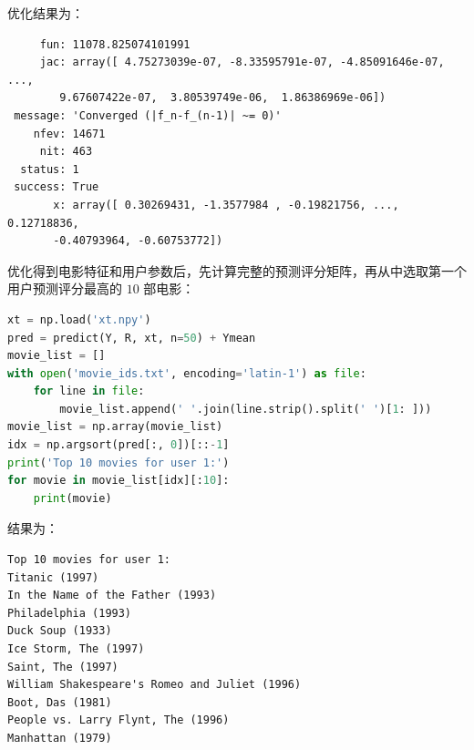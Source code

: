 优化结果为：

\begin{lstlisting}
     fun: 11078.825074101991
     jac: array([ 4.75273039e-07, -8.33595791e-07, -4.85091646e-07, ...,
        9.67607422e-07,  3.80539749e-06,  1.86386969e-06])
 message: 'Converged (|f_n-f_(n-1)| ~= 0)'
    nfev: 14671
     nit: 463
  status: 1
 success: True
       x: array([ 0.30269431, -1.3577984 , -0.19821756, ...,  0.12718836,
       -0.40793964, -0.60753772])
\end{lstlisting}

优化得到电影特征和用户参数后，先计算完整的预测评分矩阵，再从中选取第一个用户预测评分最高的 $10$ 部电影：

\begin{lstlisting}[language=Python]
xt = np.load('xt.npy')
pred = predict(Y, R, xt, n=50) + Ymean
movie_list = []
with open('movie_ids.txt', encoding='latin-1') as file:
	for line in file:
		movie_list.append(' '.join(line.strip().split(' ')[1: ]))
movie_list = np.array(movie_list)
idx = np.argsort(pred[:, 0])[::-1]
print('Top 10 movies for user 1:')
for movie in movie_list[idx][:10]:
	print(movie)
\end{lstlisting}

结果为：

\begin{lstlisting}
Top 10 movies for user 1:
Titanic (1997)
In the Name of the Father (1993)
Philadelphia (1993)
Duck Soup (1933)
Ice Storm, The (1997)
Saint, The (1997)
William Shakespeare's Romeo and Juliet (1996)
Boot, Das (1981)
People vs. Larry Flynt, The (1996)
Manhattan (1979)
\end{lstlisting}
